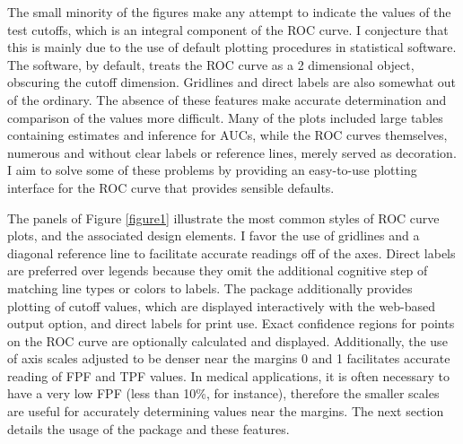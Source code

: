 \documentclass[codesnippet]{jss}
\begin{document}
The small minority of the figures make any attempt to indicate the
values of the test cutoffs, which is an integral component of the ROC
curve. I conjecture that this is mainly due to the use of default
plotting procedures in statistical software. The software, by default,
treats the ROC curve as a 2 dimensional object, obscuring the cutoff
dimension. Gridlines and direct labels are also somewhat out of the
ordinary. The absence of these features make accurate determination and
comparison of the values more difficult. Many of the plots included
large tables containing estimates and inference for AUCs, while the ROC
curves themselves, numerous and without clear labels or reference lines,
merely served as decoration. I aim to solve some of these problems by
providing an easy-to-use plotting interface for the ROC curve that
provides sensible defaults.

The panels of Figure \ref{figure1} illustrate the most common styles of
ROC curve plots, and the associated design elements. I favor the use of
gridlines and a diagonal reference line to facilitate accurate readings
off of the axes. Direct labels are preferred over legends because they
omit the additional cognitive step of matching line types or colors to
labels. The  package additionally provides plotting of
cutoff values, which are displayed interactively with the web-based
output option, and direct labels for print use. Exact confidence regions
for points on the ROC curve are optionally calculated and displayed.
Additionally, the use of axis scales adjusted to be denser near the
margins 0 and 1 facilitates accurate reading of FPF and TPF values. In
medical applications, it is often necessary to have a very low FPF (less
than 10\%, for instance), therefore the smaller scales are useful for
accurately determining values near the margins. The next section details
the usage of the   package and these features.
\end{document}
